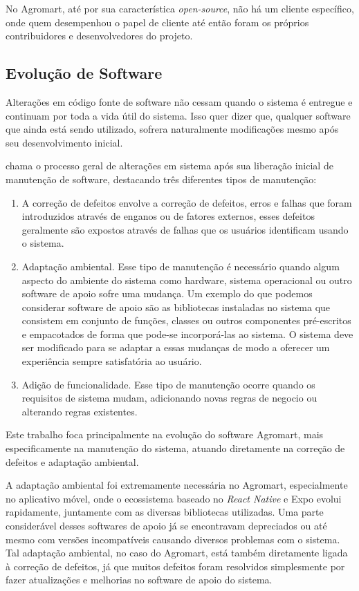 No Agromart, até por sua característica \textit{open-source}, não há um cliente específico, onde quem desempenhou o papel de cliente até então foram os próprios contribuidores e desenvolvedores do projeto.

\subsection{Evolução de Software}
Alterações em código fonte de software não cessam quando o sistema é entregue e continuam por toda a vida útil do sistema. Isso quer dizer que, qualquer software que ainda está sendo utilizado, sofrera naturalmente modificações mesmo após seu desenvolvimento inicial. 

\citeauthor[p. 170]{Sommerville2007} chama o processo geral de alterações em sistema após sua liberação inicial de manutenção de software, destacando três diferentes tipos de manutenção:

\begin{enumerate}
    \item A correção de defeitos envolve a correção de defeitos, erros e falhas que foram introduzidos através de enganos ou de fatores externos, esses defeitos geralmente são expostos através de falhas que os usuários identificam usando o sistema.
    \item Adaptação ambiental. Esse tipo de manutenção é necessário quando algum aspecto do ambiente do sistema como hardware, sistema operacional ou outro software de apoio sofre uma mudança. Um exemplo do que podemos considerar software de apoio são as bibliotecas instaladas no sistema que consistem em conjunto de funções, classes ou outros componentes pré-escritos e empacotados de forma que pode-se incorporá-las ao sistema. O sistema deve ser modificado para se adaptar a essas mudanças de modo a oferecer um experiência sempre satisfatória ao usuário.
    \item Adição de funcionalidade. Esse tipo de manutenção ocorre quando os requisitos de sistema mudam, adicionando novas regras de negocio ou alterando regras existentes.
\end{enumerate}

Este trabalho foca principalmente na evolução do software Agromart, mais especificamente na manutenção do sistema, atuando diretamente na correção de defeitos e adaptação ambiental.

A adaptação ambiental foi extremamente necessária no Agromart, especialmente no aplicativo móvel, onde o ecossistema baseado no \textit{React Native} e Expo evolui rapidamente, juntamente com as diversas bibliotecas utilizadas. Uma parte considerável desses softwares de apoio já se encontravam depreciados ou até mesmo com versões incompatíveis causando diversos problemas com o sistema. Tal adaptação ambiental, no caso do Agromart, está também diretamente ligada à correção de defeitos, já que muitos defeitos foram resolvidos simplesmente por fazer atualizações e melhorias no software de apoio do sistema.

